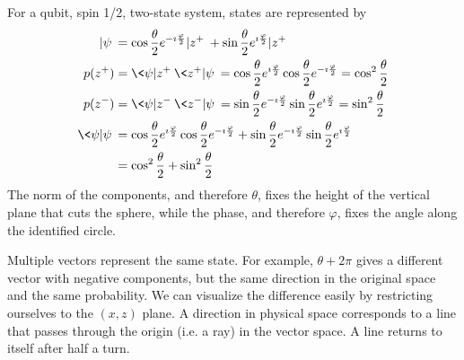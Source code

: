 \documentclass{techbrief}
\begin{document}
For a qubit, spin 1/2, two-state system, states are represented by
\begin{equation}
	\begin{aligned}
		| \psi \> &= \cos \frac{\theta}{2} e^{-\imath \frac{\varphi}{2}} | z^+ \> + \sin \frac{\theta}{2} e^{\imath \frac{\varphi}{2}} | z^+ \> \\
		p(z^+) &= \<\psi | z^+ \> \< z^+ | \psi \> = \cos \frac{\theta}{2} e^{\imath \frac{\varphi}{2}} \cos \frac{\theta}{2} e^{-\imath \frac{\varphi}{2}} = \cos^2 \frac{\theta}{2} \\
	p(z^-) &= \<\psi | z^- \> \< z^- | \psi \> = \sin \frac{\theta}{2} e^{-\imath \frac{\varphi}{2}} \sin \frac{\theta}{2} e^{\imath \frac{\varphi}{2}} = \sin^2 \frac{\theta}{2} \\
		\< \psi | \psi \> &= \cos \frac{\theta}{2} e^{\imath \frac{\varphi}{2}} \cos \frac{\theta}{2} e^{-\imath \frac{\varphi}{2}} + \sin \frac{\theta}{2} e^{-\imath \frac{\varphi}{2}} \sin \frac{\theta}{2} e^{\imath \frac{\varphi}{2}} \\
		&= \cos^2 \frac{\theta}{2} + \sin^2 \frac{\theta}{2} \\
	\end{aligned}
\end{equation}
The norm of the components, and therefore $\theta$, fixes the height of the vertical plane that cuts the sphere, while the phase, and therefore $\varphi$, fixes the angle along the identified circle.

Multiple vectors represent the same state. For example, $\theta + 2\pi$ gives a different vector with negative components, but the same direction in the original space and the same probability. We can visualize the difference easily by restricting ourselves to the $(x,z)$ plane. A direction in physical space corresponds to a line that passes through the origin (i.e. a ray) in the vector space. A line returns to itself after half a turn.
\end{document}
